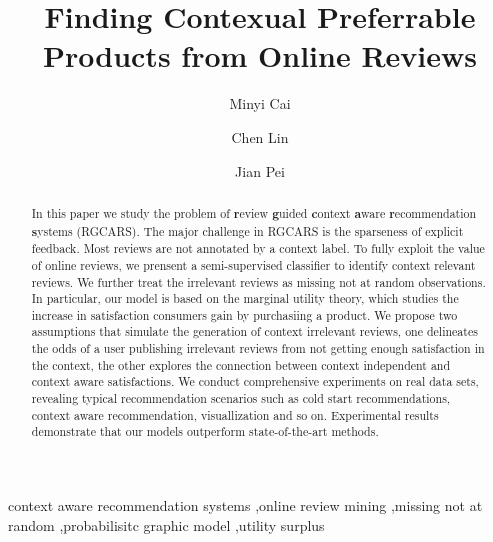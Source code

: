 \documentclass[preprint,12pt]{elsarticle}
\begin{document}
\begin{frontmatter}

\title{Finding Contexual Preferrable Products from Online Reviews}
\author{Minyi Cai}
\author{Chen Lin}
\address{School of Information Science and Engineering, Xiamen University, Xiamen, 361005, China}
\author{Jian Pei}
\address{School of Computing Science, Simon Fraser University, Burnaby, V5A1S6, Canada}


\maketitle
\begin{abstract}
In this paper we study the problem of \textbf{r}eview \textbf{g}uided \textbf{c}ontext \textbf{a}ware \textbf{r}ecommendation \textbf{s}ystems (RGCARS). The major challenge in RGCARS is the sparseness of explicit feedback. Most reviews are not annotated by a context label. To fully exploit the value of online reviews, we prensent a semi-supervised classifier to identify context relevant reviews. We further treat the irrelevant reviews as missing not at random observations. In particular, our model is based on the marginal utility theory, which studies the increase in satisfaction consumers gain by purchasiing a product. We propose two assumptions that simulate the generation of context irrelevant reviews, one delineates the odds of a user publishing irrelevant reviews from not getting enough satisfaction in the context, the other explores the connection between context independent and context aware satisfactions. We conduct comprehensive experiments on real data sets, revealing typical recommendation scenarios such as cold start recommendations, context aware recommendation, visuallization and so on. Experimental results demonstrate that our models outperform state-of-the-art methods. 
\end{abstract}

\begin{keyword}
context aware recommendation systems \sep online review mining \sep missing not at random \sep probabilisitc graphic model \sep utility surplus
\end{keyword}

\end{frontmatter}

\end{document}
